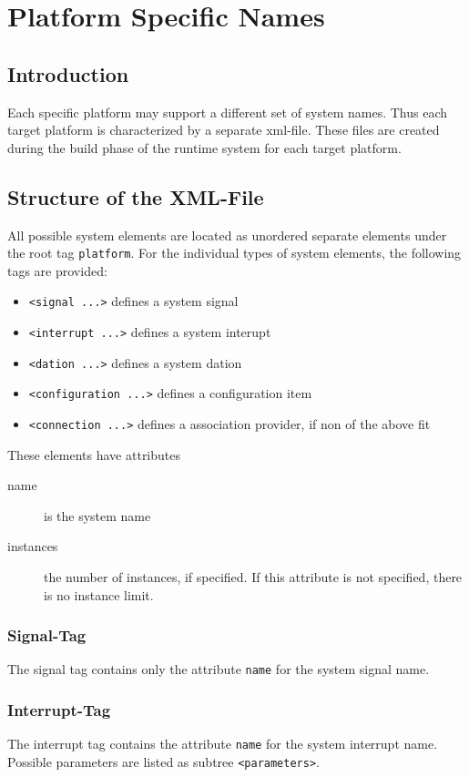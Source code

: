 \chapter{Platform Specific Names}

\section{Introduction}
Each specific platform may support a different set of system names.
Thus each target platform is characterized by a separate xml-file.
These files are created during the build phase of the runtime system
for each target platform.

\section{Structure of the XML-File}
All possible system elements are located as unordered separate 
elements under the root tag \verb|platform|.
For the individual types of system elements, the following tags are
provided:
\begin{itemize}
\item \verb|<signal ...>| defines a system signal
\item \verb|<interrupt ...>| defines a system interupt
\item \verb|<dation ...>| defines a system dation
\item \verb|<configuration ...>| defines a configuration item
\item \verb|<connection ...>| defines a association provider, if 
   non of the above fit
\end{itemize}

These elements have attributes 
\begin{description}
\item [name] is the system name
\item [instances] the number of instances, if specified. If this attribute 
   is not specified, there is no instance limit.
\end{description}

\subsection{Signal-Tag}
The signal tag contains only the attribute \verb|name| for the
system signal name.

\subsection{Interrupt-Tag}
The interrupt tag contains the attribute \verb|name| for the
system interrupt name.
Possible parameters are listed as subtree \verb|<parameters>|.

